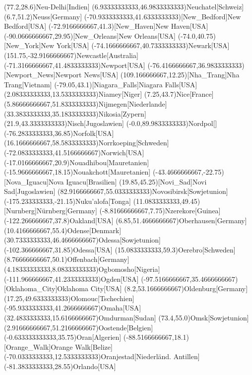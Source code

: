 \mapput(77.2,28.6){Neu-Delhi}[Indien]
\mapput(6.93333333333,46.9833333333){Neuchatel}[Schweiz]
\mapput(6.7,51.2){Neuss}[Germany]
\mapput(-70.9333333333,41.6333333333)[New_Bedford]{New Bedford}[USA]
\mapput(-72.9166666667,41.3)[New_Haven]{New Haven}[USA]
\mapput(-90.0666666667,29.95)[New_Orleans]{New Orleans}[USA]
\mapput(-74.0,40.75)[New_York]{New York}[USA]
\mapput(-74.1666666667,40.7333333333){Newark}[USA]
\mapput(151.75,-32.9166666667){Newcastle}[Australia]
\mapput(-71.3166666667,41.4833333333){Newport}[USA]
\mapput(-76.4166666667,36.9833333333)[Newport_News]{Newport News}[USA]
\mapput(109.166666667,12.25)[Nha_Trang]{Nha Trang}[Vietnam]
\mapput(-79.05,43.1)[Niagara_Falls]{Niagara Falls}[USA]
\mapput(2.08333333333,13.5333333333){Niamey}[Niger]
\mapput(7.25,43.7){Nice}[France]
\mapput(5.86666666667,51.8333333333){Nijmegen}[Niederlande]
\mapput(33.3833333333,35.1833333333){Nikosia}[Zypern]
\mapput(21.9,43.3333333333){Nisch}[Jugoslawien]
\mapput(-0.0,89.9833333333){Nordpol}[]
\mapput(-76.2833333333,36.85){Norfolk}[USA]
\mapput(16.1666666667,58.5833333333){Norrkoeping}[Schweden]
\mapput(-72.0833333333,41.5166666667){Norwich}[USA]
\mapput(-17.0166666667,20.9){Nouadhibou}[Mauretanien]
\mapput(-15.9666666667,18.15){Nouakchott}[Mauretanien]
\mapput(-43.4666666667,-22.75)[Nova_Iguacu]{Nova Iguacu}[Brasilien]
\mapput(19.85,45.25)[Novi_Sad]{Novi Sad}[Jugoslawien]
\mapput(82.9166666667,55.0333333333){Novosibirsk}[Sowjetunion]
\mapput(-175.233333333,-21.15){Nuku'alofa}[Tonga]
\mapput(11.0833333333,49.45)[Nurnberg]{Nürnberg}[Germany]
\mapput(-8.81666666667,7.75){Nzerekore}[Guinea]
\mapput(-122.266666667,37.8){Oakland}[USA]
\mapput(6.85,51.4666666667){Oberhausen}[Germany]
\mapput(10.4166666667,55.4){Odense}[Denmark]
\mapput(30.7333333333,46.4666666667){Odessa}[Sowjetunion]
\mapput(-102.366666667,31.85){Odessa}[USA]
\mapput(15.0833333333,59.3){Oerebro}[Schweden]
\mapput(8.76666666667,50.1){Offenbach}[Germany]
\mapput(4.18333333333,8.08333333333){Ogbomosho}[Nigeria]
\mapput(-111.966666667,41.2333333333){Ogden}[USA]
\mapput(-97.5166666667,35.4666666667)[Oklahoma_City]{Oklahoma City}[USA]
\mapput(8.2,53.1666666667){Oldenburg}[Germany]
\mapput(17.25,49.6333333333){Olomouc}[Tschechien]
\mapput(-95.9333333333,41.2666666667){Omaha}[USA]
\mapput(32.4833333333,15.6166666667){Omdurman}[Sudan]
\mapput(73.4,55.0){Omsk}[Sowjetunion]
\mapput(2.91666666667,51.2166666667){Oostende}[Belgien]
\mapput(-0.633333333333,35.75){Oran}[Algerien]
\mapput(-88.5166666667,18.1)[Orange_Walk]{Orange Walk}[Belize]
\mapput(-70.0333333333,12.5333333333){Oranjestad}[Niederländ. Antillen]
\mapput(-81.3833333333,28.55){Orlando}[USA]
